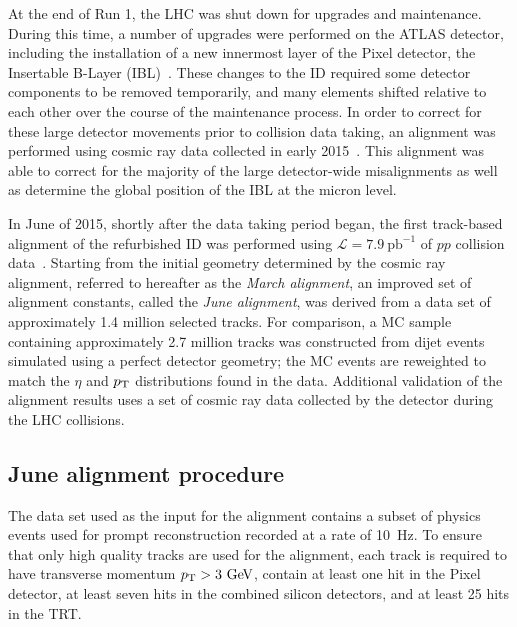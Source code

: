 At the end of Run 1, the LHC was shut down for upgrades and maintenance.
During this time, a number of upgrades were performed on the ATLAS detector, including the installation of a new innermost layer of the Pixel detector, the Insertable B-Layer (IBL)~\cite{2010.ibl-tdr}. 
These changes to the ID required some detector components to be removed temporarily, and many elements shifted relative to each other over the course of the maintenance process.
In order to correct for these large detector movements prior to  collision data taking, an alignment was performed using cosmic ray data collected in early 2015~\cite{2015.alignment-2015-cosmic}.
This alignment was able to correct for the majority of the large detector-wide misalignments as well as determine the global position of the IBL at the micron level.

In June of 2015, shortly after the data taking period began, the first track-based alignment of the refurbished ID was performed using $\mathcal{L} = 7.9~\mathrm{pb}^{-1}$ of  $pp$ collision data~\cite{2015.alignment-13tev}.
Starting from the initial geometry determined by the cosmic ray alignment, referred to hereafter as the \emph{March alignment}, an improved set of alignment constants, called the \emph{June alignment}, was derived from a data set of approximately 1.4 million selected tracks.
For comparison, a MC sample containing approximately 2.7 million tracks was constructed from dijet events simulated using a perfect detector geometry; the MC events are reweighted to match the $\eta$ and $p_{\mathrm{T}}$ distributions found in the data.
Additional validation of the alignment results uses a set of cosmic ray data collected by the detector during the LHC collisions.

\subsection{June alignment procedure}
The data set used as the input for the alignment contains a subset of physics events used for prompt reconstruction recorded at a rate of 10~Hz.
To ensure that only high quality tracks are used for the alignment, each track is required to have transverse momentum $\pt > 3\gev$, contain at least one hit in the Pixel detector, at least seven hits in the combined silicon detectors, and at least 25 hits in the TRT.

